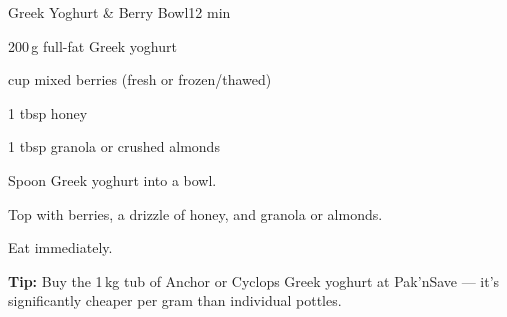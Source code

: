 \begin{recipebox}{Greek Yoghurt \& Berry Bowl}{1}{2 min}
\begin{ingredients}
  \item 200\,g full-fat Greek yoghurt
  \item \textonehalf{} cup mixed berries (fresh or frozen/thawed)
  \item 1 tbsp honey
  \item 1 tbsp granola or crushed almonds
\end{ingredients}

\begin{method}
  \item Spoon Greek yoghurt into a bowl.
  \item Top with berries, a drizzle of honey, and granola or almonds.
  \item Eat immediately.
\end{method}

\begin{notelist}
  \item \textbf{Tip:} Buy the 1\,kg tub of Anchor or Cyclops Greek yoghurt at Pak'nSave --- it's significantly cheaper per gram than individual pottles.
\end{notelist}
\end{recipebox}
